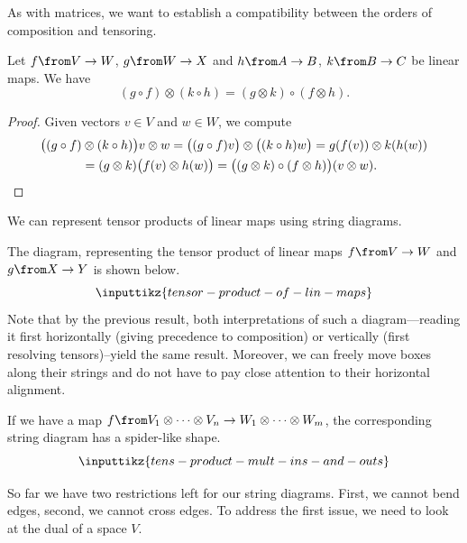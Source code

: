 \documentclass[a4paper,oneside, 12pt]{amsart}
\begin{document}
As with matrices, we want to establish a compatibility between the orders of composition and tensoring.

\begin{lemma}\label{lem:comp-vs-tensoring}
  Let \(f\from V\to W\), \(g\from W\to X\) and \(h\from A \to B\), \(k \from B\to C\) be linear maps.
  We have
  \begin{equation*}
    (g\circ f)\otimes (k \circ h) = (g \otimes k)\circ (f\otimes h).
  \end{equation*}
\end{lemma}
\begin{proof}
  Given vectors \(v\in V\) and \(w\in W\), we compute
  \begin{align*}
    \big((g\circ f)&\otimes (k \circ h)\big) v\otimes w
    = \big((g\circ f) v\big) \otimes \big((k \circ h) w\big)
    = g(f(v)) \otimes k(h(w))\\
    &= (g \otimes k)\big( f(v) \otimes h(w)\big)
    = \big((g\otimes k) \circ (f\otimes h)\big) (v\otimes w). \qedhere
  \end{align*}
\end{proof}

We can represent tensor products of linear maps using string diagrams.

\begin{remark}\label{rmk:string-diags-tensoring-linear-maps}
  The diagram, representing the tensor product of linear  maps \(f\from V\to W\) and \(g\from X\to Y\)
  is shown below.
  \begin{equation*}
    \inputtikz{tensor-product-of-lin-maps}
  \end{equation*}
  Note that by the previous result, both interpretations of such a diagram---reading it first horizontally (\ie giving precedence to composition) or vertically (first resolving tensors)--yield the same result.
  Moreover, we can freely move boxes along their strings and do not have to pay close attention to their horizontal alignment.

  If we have a map \(f\from V_{1} \otimes \dots \otimes V_{n} \to W_{1}\otimes \dots \otimes W_{m}\), the corresponding string diagram has a spider-like shape.
  \begin{equation*}
    \inputtikz{tens-product-mult-ins-and-outs}
  \end{equation*}
\end{remark}

So far we have two restrictions left for our string diagrams.
First, we cannot bend edges, second, we cannot cross edges.
To address the first issue, we need to look at the dual of a space \(V\).
\end{document}
